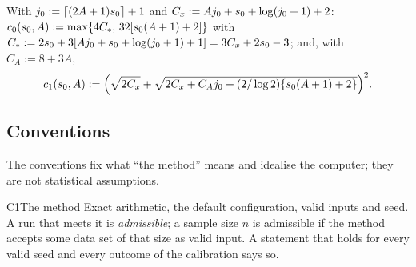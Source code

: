 \begin{definition}\label{def:constants}
With $j_0:=\lceil(2A+1)s_0\rceil+1$ and $C_x:=Aj_0+s_0+\log(j_0+1)+2$:
$c_0(s_0,A):=\max\{4C_*,\,32[s_0(A+1)+2]\}$ with $C_*:=2s_0+3[Aj_0+s_0+\log(j_0+1)+1]=3C_x+2s_0-3$; and, with
$C_A:=8+3A$,
\[
  c_1(s_0,A):=\Big(\sqrt{2C_x}+\sqrt{2C_x+C_Aj_0+(2/\log2)\{s_0(A+1)+2\}}\Big)^2 .
\]
\end{definition}

\subsection{Conventions}\label{sec:conventions}

The conventions fix what ``the method'' means and idealise the computer; they are not statistical assumptions.

\begin{convention}{C1}{The method}
Exact arithmetic, the default configuration, valid inputs and seed. A run that meets it is \emph{admissible}; a sample
size $n$ is admissible if the method accepts some data set of that size as valid input. A statement that holds for every
valid seed and every outcome of the calibration says so.
\end{convention}


